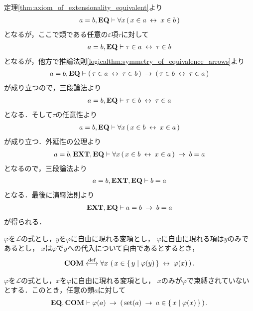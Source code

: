 	\begin{prf}
		定理\ref{thm:axiom_of_extensionality_equivalent}より
		\begin{align}
			a=b,\mbox{{\bf EQ}} \vdash \forall x\, (\, x \in a  \hspace{0.25em}\leftrightarrow\hspace{0.25em} x \in b\, )
		\end{align}
		となるが，ここで類である任意の$\varepsilon$項$\tau$に対して
		\begin{align}
			a=b,\mbox{{\bf EQ}} \vdash \tau \in a \hspace{0.25em}\leftrightarrow\hspace{0.25em} \tau \in b
		\end{align}
		となるが，他方で推論法則\ref{logicalthm:symmetry_of_equivalence_arrows}より
		\begin{align}
			a=b,\mbox{{\bf EQ}} \vdash (\, \tau \in a \hspace{0.25em}\leftrightarrow\hspace{0.25em} \tau \in b\, )
				\hspace{0.25em}\rightarrow\hspace{0.25em} (\, \tau \in b \hspace{0.25em}\leftrightarrow\hspace{0.25em} \tau \in a\, )
		\end{align}
		が成り立つので，三段論法より
		\begin{align}
			a=b,\mbox{{\bf EQ}} \vdash \tau \in b \hspace{0.25em}\leftrightarrow\hspace{0.25em} \tau \in a
		\end{align}
		となる．そして$\tau$の任意性より
		\begin{align}
			a=b,\mbox{{\bf EQ}} \vdash \forall x\, (\, x \in b  \hspace{0.25em}\leftrightarrow\hspace{0.25em} x \in a\, )
		\end{align}
		が成り立つ．外延性の公理より
		\begin{align}
			a=b,\mbox{{\bf EXT}},\mbox{{\bf EQ}} \vdash \forall x\, (\, x \in b  \hspace{0.25em}\leftrightarrow\hspace{0.25em} x \in a\, )
			\hspace{0.25em}\rightarrow\hspace{0.25em} b = a
		\end{align}
		となるので，三段論法より
		\begin{align}
			a=b,\mbox{{\bf EXT}},\mbox{{\bf EQ}} \vdash b = a
		\end{align}
		となる．最後に演繹法則より
		\begin{align}
			\mbox{{\bf EXT}},\mbox{{\bf EQ}} \vdash a = b \hspace{0.25em}\rightarrow\hspace{0.25em} b = a
		\end{align}
		が得られる．
		\QED
	\end{prf}
	
	\begin{screen}
		\begin{axm}[内包性公理] 
			$\varphi$を$\mathcal{L}$の式とし，$y$を$\varphi$に自由に現れる変項とし，
			$\varphi$に自由に現れる項は$y$のみであるとし，
			$x$は$\varphi$で$y$への代入について自由であるとするとき，
			\begin{align}
				\mbox{\bf COM} \overset{\mathrm{def}}{\longleftrightarrow} \forall x\, \left(\, x \in \left\{\, y \mid \varphi(y)\, \right\} \hspace{0.25em}\leftrightarrow\hspace{0.25em} \varphi(x)\, \right).
			\end{align}
		\end{axm}
	\end{screen}
	
	\begin{screen}
		\begin{thm}[条件を満たす集合は要素である]\label{thm:satisfactory_set_is_an_element}
			$\varphi$を$\mathcal{L}$の式とし，$x$を$\varphi$に自由に現れる変項とし，
			$x$のみが$\varphi$で束縛されていないとする．このとき，任意の類$a$に対して
			\begin{align}
				\mbox{{\bf EQ}},\mbox{\bf COM} \vdash \varphi(a) \hspace{0.25em}\rightarrow\hspace{0.25em} 
				\left(\, \operatorname*{set} (a) \hspace{0.25em}\rightarrow\hspace{0.25em} a \in \left\{\, x \mid \varphi(x)\, \right\}\, \right).
			\end{align}
		\end{thm}
	\end{screen}
	
